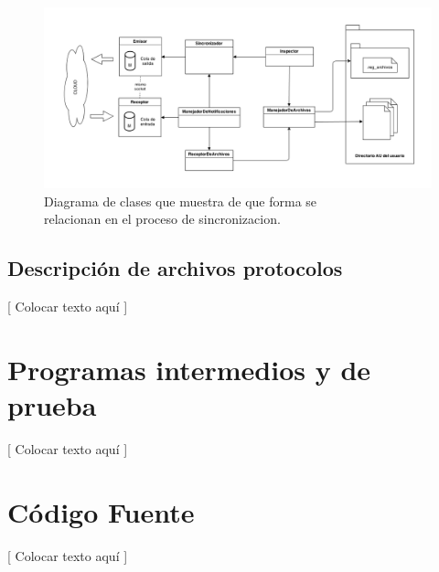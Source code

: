 \documentclass{article}
\begin{document}
\begin{figure}[h]
	\centering
	\includegraphics[width=1.0\textwidth]{images/Diagrama-modelo-cliente.png}
	\caption{Diagrama de clases que muestra de que forma se \\ relacionan en el proceso de sincronizacion.}
\end{figure}
\bigskip



\subsection{Descripción de archivos  protocolos}

	[ Colocar texto aquí ]
\bigskip




\section{Programas intermedios y de prueba}

	[ Colocar texto aquí ]
\bigskip




\section{Código Fuente}

	[ Colocar texto aquí ]
\bigskip
\end{document}
